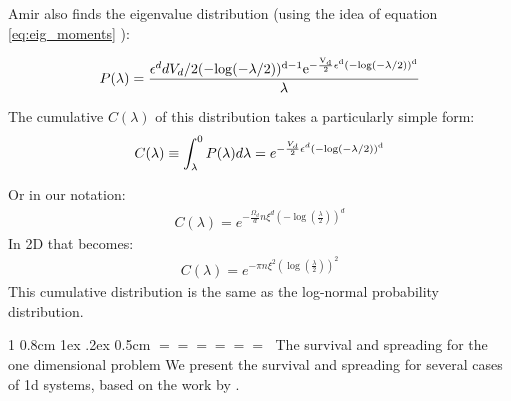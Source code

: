 \documentclass[onecolumn,fleqn,notitlepage,secnumarabic]{revtex4}
\makeatletter
\newenvironment{fminipage}%
  {\begin{Sbox}\begin{minipage}}%
  {\end{minipage}\end{Sbox}\fbox{\TheSbox}}
\def\section{%
  \@startsection
    {section}%
    {1}%
    {\z@}%
    {0.8cm \@plus1ex \@minus .2ex}%
    {0.5cm}%
    {\Large\bf $=\!=\!=\!=\!=\!=\;$}%
}%
\makeatother
\begin{document}
Amir also finds the eigenvalue distribution (using the idea of equation \eqref{eq:eig_moments} ):

\begin{fminipage}{\textwidth}
\begin{align} P(\lambda)=  \frac{\epsilon^d d V_d /2
(-\rm{log}(-\lambda/2))^{d-1} e^{-\frac{V_d}{2} \epsilon^d
(-\rm{log}(-\lambda/2))^d}}{\lambda} \end{align}


The cumulative $C(\lambda)$ of this distribution takes a
particularly simple form: 
\begin{align} C(\lambda)\equiv \int_\lambda^0
P(\lambda)d\lambda= e^{-\frac{V_d}{2} \epsilon^d
(-\rm{log}(-\lambda/2))^d} \end{align}
\end{fminipage}
Or in our notation:
\begin{align} C(\lambda)= e^{-\frac{\Omega_d}{d} n\xi^d \left( -\log(\frac{\lambda}{2})\right)^d}  \end{align}
In 2D that becomes:
\begin{align} C(\lambda) = e^{-\pi n\xi^2 \left(\log(\frac{\lambda}{2})\right)^2 } \end{align}
This cumulative distribution is the same as the log-normal probability distribution. 

\section{The survival and spreading for the one dimensional problem}\label{sec:alexander}
We present the survival and spreading for several cases of 1d systems, based on the work by \textcite{Alexander:1981:RMP}.
\end{document}

